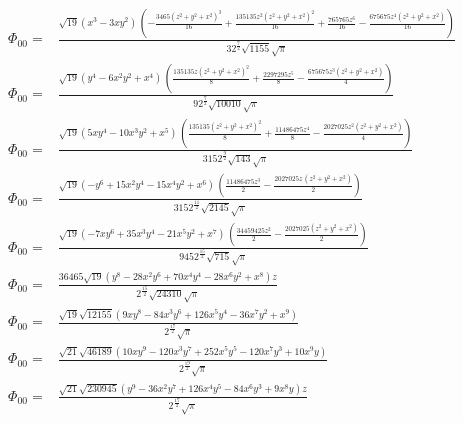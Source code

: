 \documentclass[10pt]{article}
\begin{document}
\begin{align*}
\Phi_{00} = &\frac{\sqrt{19} \left( {{x}^{3}}-3 x {{y}^{2}}\right) \, \left( -\frac{3465 {{\left( {{z}^{2}}+{{y}^{2}}+{{x}^{2}}\right) }^{3}}}{16}+\frac{135135 {{z}^{2}} {{\left( {{z}^{2}}+{{y}^{2}}+{{x}^{2}}\right) }^{2}}}{16}+\frac{765765 {{z}^{6}}}{16}-\frac{675675 {{z}^{4}} \left( {{z}^{2}}+{{y}^{2}}+{{x}^{2}}\right) }{16}\right) }{3 {{2}^{\frac{7}{2}}} \sqrt{1155} \sqrt{\ensuremath{\pi} }}\\
\Phi_{00} = &\frac{\sqrt{19} \left( {{y}^{4}}-6 {{x}^{2}} {{y}^{2}}+{{x}^{4}}\right) \, \left( \frac{135135 z {{\left( {{z}^{2}}+{{y}^{2}}+{{x}^{2}}\right) }^{2}}}{8}+\frac{2297295 {{z}^{5}}}{8}-\frac{675675 {{z}^{3}} \left( {{z}^{2}}+{{y}^{2}}+{{x}^{2}}\right) }{4}\right) }{9 {{2}^{\frac{7}{2}}} \sqrt{10010} \sqrt{\ensuremath{\pi} }}\\
\Phi_{00} = &\frac{\sqrt{19} \left( 5 x {{y}^{4}}-10 {{x}^{3}} {{y}^{2}}+{{x}^{5}}\right) \, \left( \frac{135135 {{\left( {{z}^{2}}+{{y}^{2}}+{{x}^{2}}\right) }^{2}}}{8}+\frac{11486475 {{z}^{4}}}{8}-\frac{2027025 {{z}^{2}} \left( {{z}^{2}}+{{y}^{2}}+{{x}^{2}}\right) }{4}\right) }{315 {{2}^{\frac{9}{2}}} \sqrt{143} \sqrt{\ensuremath{\pi} }}\\
\Phi_{00} = &\frac{\sqrt{19} \left( -{{y}^{6}}+15 {{x}^{2}} {{y}^{4}}-15 {{x}^{4}} {{y}^{2}}+{{x}^{6}}\right) \, \left( \frac{11486475 {{z}^{3}}}{2}-\frac{2027025 z\, \left( {{z}^{2}}+{{y}^{2}}+{{x}^{2}}\right) }{2}\right) }{315 {{2}^{\frac{11}{2}}} \sqrt{2145} \sqrt{\ensuremath{\pi} }}\\
\Phi_{00} = &\frac{\sqrt{19} \left( -7 x {{y}^{6}}+35 {{x}^{3}} {{y}^{4}}-21 {{x}^{5}} {{y}^{2}}+{{x}^{7}}\right) \, \left( \frac{34459425 {{z}^{2}}}{2}-\frac{2027025 \left( {{z}^{2}}+{{y}^{2}}+{{x}^{2}}\right) }{2}\right) }{945 {{2}^{\frac{15}{2}}} \sqrt{715} \sqrt{\ensuremath{\pi} }}\\
\Phi_{00} = &\frac{36465 \sqrt{19} \left( {{y}^{8}}-28 {{x}^{2}} {{y}^{6}}+70 {{x}^{4}} {{y}^{4}}-28 {{x}^{6}} {{y}^{2}}+{{x}^{8}}\right)  z}{{{2}^{\frac{15}{2}}} \sqrt{24310} \sqrt{\ensuremath{\pi} }}\\
\Phi_{00} = &\frac{\sqrt{19} \sqrt{12155} \left( 9 x {{y}^{8}}-84 {{x}^{3}} {{y}^{6}}+126 {{x}^{5}} {{y}^{4}}-36 {{x}^{7}} {{y}^{2}}+{{x}^{9}}\right) }{{{2}^{\frac{17}{2}}} \sqrt{\ensuremath{\pi} }}\\
\Phi_{00} = &\frac{\sqrt{21} \sqrt{46189} \left( 10 x {{y}^{9}}-120 {{x}^{3}} {{y}^{7}}+252 {{x}^{5}} {{y}^{5}}-120 {{x}^{7}} {{y}^{3}}+10 {{x}^{9}} y\right) }{{{2}^{\frac{19}{2}}} \sqrt{\ensuremath{\pi} }}\\
\Phi_{00} = &\frac{\sqrt{21} \sqrt{230945} \left( {{y}^{9}}-36 {{x}^{2}} {{y}^{7}}+126 {{x}^{4}} {{y}^{5}}-84 {{x}^{6}} {{y}^{3}}+9 {{x}^{8}} y\right)  z}{{{2}^{\frac{17}{2}}} \sqrt{\ensuremath{\pi} }}\\

\end{align*}
\end{document}
